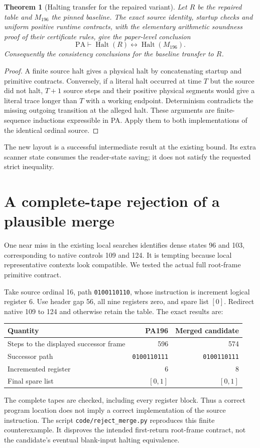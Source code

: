 \documentclass[11pt,letterpaper]{article}
\newtheorem{theorem}{Theorem}[section]
\newcommand{\PA}{\mathrm{PA}}
\newcommand{\file}[1]{\texttt{\nolinkurl{#1}}}
\begin{document}
\begin{theorem}[Halting transfer for the repaired variant]
Let $R$ be the repaired table and $M_{196}$ the pinned baseline. The exact
source identity, startup checks and uniform positive runtime contracts,
with the elementary arithmetic soundness proof of their certificate rules,
give the paper-level conclusion
\[
 \PA\vdash \operatorname{Halt}(R)
             \leftrightarrow\operatorname{Halt}(M_{196}).
\]
Consequently the consistency conclusions for the baseline transfer to $R$.
\end{theorem}
\begin{proof}
A finite source halt gives a physical halt by concatenating startup and
primitive contracts. Conversely, if a literal halt occurred at time $T$
but the source did not halt, $T+1$ source steps and their positive physical
segments would give a literal trace longer than $T$ with a working
endpoint. Determinism contradicts the missing outgoing transition at the
alleged halt. These arguments are finite-sequence inductions expressible
in PA. Apply them to both implementations of the identical ordinal source.
\end{proof}

The new layout is a successful intermediate result at the existing bound.
Its extra scanner state consumes the reader-state saving; it does not
satisfy the requested strict inequality.

\section{A complete-tape rejection of a plausible merge}

One near miss in the existing local searches identifies dense states 96
and 103, corresponding to native controls 109 and 124. It is tempting
because local representative contexts look compatible. We tested the
actual full root-frame primitive contract.

Take source ordinal 16, path \texttt{0100110110}, whose instruction is
increment logical register 6. Use header gap 56, all nine registers zero,
and spare list $[0]$. Redirect native 109 to 124 and otherwise retain the
table. The exact results are:
\begin{center}
\begin{tabular}{@{}lrr@{}}
\toprule
Quantity & PA196 & Merged candidate\\
\midrule
Steps to the displayed successor frame &596&574\\
Successor path &\texttt{0100110111}&\texttt{0100110111}\\
Incremented register &6&8\\
Final spare list &$[0,1]$&$[0,1]$\\
\bottomrule
\end{tabular}
\end{center}
The complete tapes are checked, including every register block. Thus a
correct program location does not imply a correct implementation of the
source instruction. The script \file{code/reject_merge.py} reproduces this
finite counterexample. It disproves the intended first-return root-frame contract, not the
candidate's eventual blank-input halting equivalence.
\end{document}
